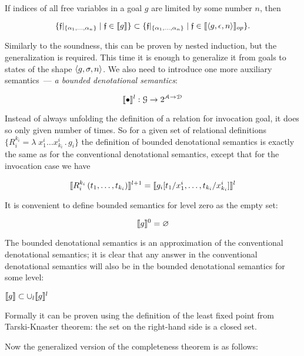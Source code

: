 \begin{theorem}
If indices of all free variables in a goal $g$ are limited by some number $n$, then

\[
\{\mathfrak{f}|_{\{\alpha_1,\dots,\alpha_n\}} \mid \mathfrak{f} \in \llbracket{g}\rrbracket\} \subset \{\mathfrak{f}|_{\{\alpha_1,\dots,\alpha_n\}} \mid \mathfrak{f} \in \llbracket{\left<{g, \epsilon, n}\right>}\rrbracket_{op}\}.
\]
\end{theorem}


Similarly to the soundness, this can be proven by nested induction, but the generalization is required. This time it is enough to generalize it from goals
to states of the shape $\left<{g, \sigma, n}\right>$. We also need to introduce one more auxiliary semantics~--- \emph{a bounded denotational semantics}:

\[
\llbracket{\bullet}\rrbracket^l : \mathcal{G} \to 2^{\mathcal{A}\to\mathcal{D}}
\]

Instead of always unfolding the definition of a relation for invocation goal, it does so only given number of times. So for a given set of relational
definitions $\{R_i^{k_i} = \lambda\;x_1^i\dots x_{k_i}^i\,.\, g_i\}$ the definition of bounded denotational semantics is exactly the same as for the conventional denotational semantics,
except that for the invocation case we have

\[
\llbracket{R_i^{k_i}\,(t_1,\dots,t_{k_i})}\rrbracket^{l+1} = \llbracket{g_i[t_1/x_1^i, \dots, t_{k_i}/x_{k_i}^i]}\rrbracket^{l}
\]

It is convenient to define bounded semantics for level zero as the empty set:

\[
\llbracket{g}\rrbracket^{0} = \varnothing
\]

The bounded denotational semantics is an approximation of the conventional denotational semantics; it is clear that any answer in the conventional denotational semantics will also be in
the bounded denotational semantics for some level:

\begin{lemma}
$\llbracket{g}\rrbracket \subset \cup_l \llbracket{g}\rrbracket^l$
\end{lemma}

Formally it can be proven using the definition of the least fixed point from Tarski-Knaster theorem: the set on the right-hand side is a closed set.

Now the generalized version of the completeness theorem is as follows:

